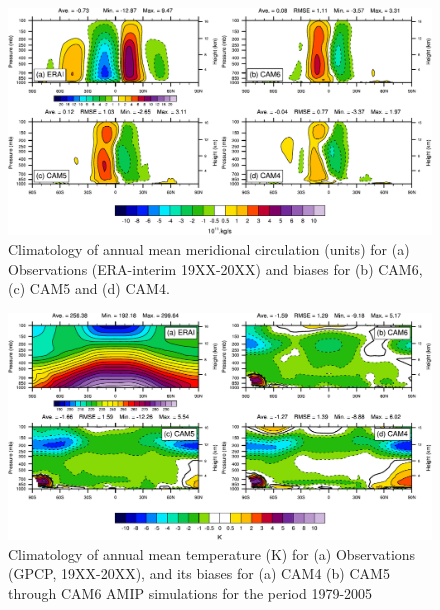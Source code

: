 \clearpage
\begin{figure}[t]
  \begin{center}
    \includegraphics[width=1.1\textwidth,angle=0.]{./figs/f_MMC_2D_ANN_CAM456.pdf}
  \end{center}
  \caption{Climatology of annual mean meridional circulation (units) for (a) Observations (ERA-interim 19XX-20XX) and biases for (b) CAM6, (c) CAM5 and (d) CAM4.} 
\label{f_MMC_2D_ANN_CAM456}
\end{figure} 


\clearpage
\begin{figure}[t]
    \includegraphics[width=1.\textwidth,angle=0.]{./figs/f_T_2D_ANN_CAM456.pdf}
  \caption{Climatology of annual mean temperature (K) for (a) Observations (GPCP, 19XX-20XX), and its biases for (a) CAM4 (b) CAM5  through CAM6 AMIP simulations for the period 1979-2005} 
\label{f_T_2D_ANN_CAM456}
\end{figure} 


